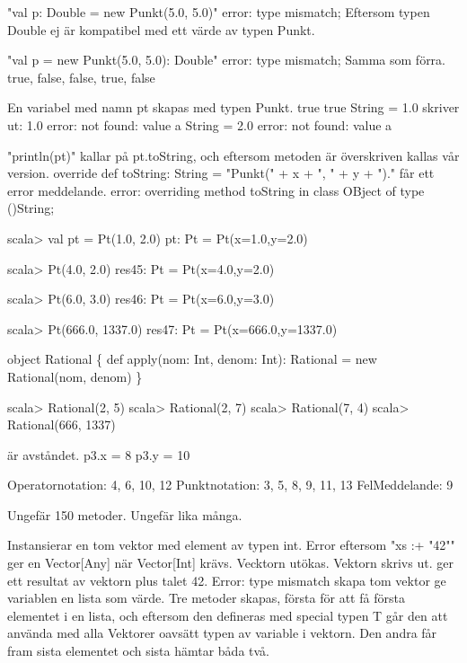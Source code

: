 "val p: Double = new Punkt(5.0, 5.0)" error: type mismatch;
Eftersom typen Double ej är kompatibel med ett värde av typen Punkt.

"val p = new Punkt(5.0, 5.0): Double" error: type mismatch;
Samma som förra.
\Subtask 
true, false, false, true, false

\Task %
\Subtask 
En variabel med namn pt skapas med typen Punkt.
true
true
String = 1.0
skriver ut: 1.0
error: not found: value a
String = 2.0
error: not found: value a

\Task %
\Subtask 
"println(pt)" kallar på pt.toString, och eftersom metoden är överskriven kallas vår version.
\Subtask 
override def toString: String = "Punkt(" + x + ", " + y + ")."
\Subtask 
får ett error meddelande.
error: overriding method toString in class OBject of type ()String;

\Task %
\Subtask 
\begin{REPL}
scala> val pt = Pt(1.0, 2.0)
pt: Pt = Pt(x=1.0,y=2.0)

scala> Pt(4.0, 2.0)
res45: Pt = Pt(x=4.0,y=2.0)

scala> Pt(6.0, 3.0)
res46: Pt = Pt(x=6.0,y=3.0)

scala> Pt(666.0, 1337.0)
res47: Pt = Pt(x=666.0,y=1337.0)
\end{REPL}
\Subtask {}
\Subtask {}
\Subtask 
\begin{REPLnonum}
object Rational \{ 
def apply(nom: Int, denom: Int): Rational = new Rational(nom, denom)
\}
\end{REPLnonum}
\Subtask 
\begin{REPL}
scala> Rational(2, 5)
scala> Rational(2, 7)
scala> Rational(7, 4)
scala> Rational(666, 1337)
\end{REPL}

\Task %
\Subtask {}

\Task %
 är avståndet.
\Subtask 
p3.x = 8
p3.y = 10

\Task %
\Subtask 
Operatornotation:	4, 6, 10, 12
Punktnotation:		3, 5, 8, 9, 11, 13
FelMeddelande:		9

\Task %
\Subtask  Ungefär 150 metoder.
\Subtask  Ungefär lika många.

\Task %
\Subtask 
Instansierar en tom vektor med element av typen int.
Error eftersom "xs :+ "42"" ger en Vector[Any] när Vector[Int] krävs.
Vecktorn utökas.
Vektorn skrivs ut.
ger ett resultat av vektorn plus talet 42.
Error: type mismatch
skapa tom vektor
ge variablen en lista som värde.
\Subtask 
Tre metoder skapas, första för att få första elementet i en lista, och eftersom den defineras med special typen T går den att använda med alla Vektorer oavsätt typen av variable i vektorn. Den andra får fram sista elementet och sista hämtar båda två.

